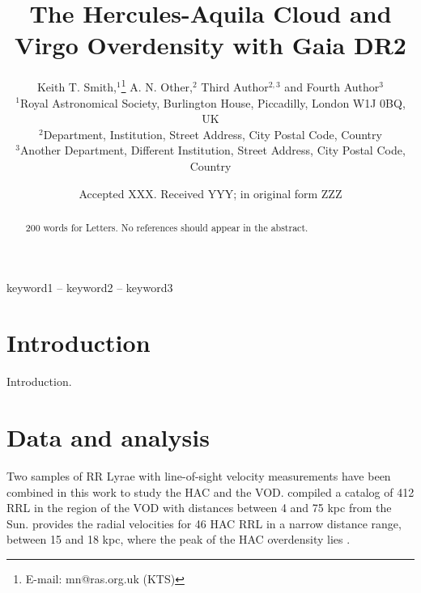 \documentclass[fleqn,usenatbib]{mnras}
\title[Short title, max. 45 characters]{The Hercules-Aquila Cloud and Virgo Overdensity with Gaia DR2}
\author[K. T. Smith et al.]{
Keith T. Smith,$^{1}$\thanks{E-mail: mn@ras.org.uk (KTS)}
A. N. Other,$^{2}$
Third Author$^{2,3}$
and Fourth Author$^{3}$
\\
$^{1}$Royal Astronomical Society, Burlington House, Piccadilly, London W1J 0BQ, UK\\
$^{2}$Department, Institution, Street Address, City Postal Code, Country\\
$^{3}$Another Department, Different Institution, Street Address, City Postal Code, Country
}
\date{Accepted XXX. Received YYY; in original form ZZZ}
\begin{document}
\label{firstpage}
\pagerange{\pageref{firstpage}--\pageref{lastpage}}
\maketitle

\begin{abstract}
200 words for Letters.
No references should appear in the abstract.
\end{abstract}

\begin{keywords}
keyword1 -- keyword2 -- keyword3
\end{keywords}



\section{Introduction}
Introduction.

\section{Data and analysis}
Two samples of RR Lyrae with line-of-sight velocity measurements have been combined in this work to study the HAC and the VOD. \cite{Vivas2016} compiled a catalog of 412 RRL in the region of the VOD with distances between 4 and 75 kpc from the Sun. \cite{Simion2018} provides the radial velocities for 46 HAC RRL in a narrow distance range, between 15 and 18 kpc, where the peak of the HAC overdensity lies \citet{Simion2014}. 
%
\end{document}
